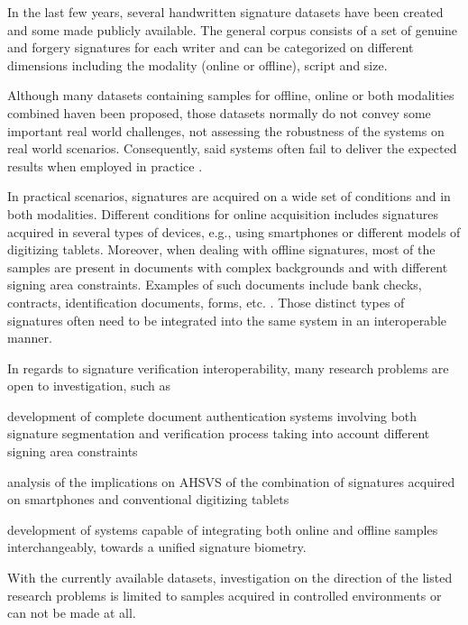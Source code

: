 In the last few years, several handwritten signature datasets have been created and some made publicly available. The general corpus consists of a set of genuine and forgery signatures for each writer and can be categorized on different dimensions including the modality (online or offline), script and size.

Although many datasets containing samples for offline, online or both modalities combined haven been proposed, those datasets normally do not convey some important real world challenges, not assessing the robustness of the systems on real world scenarios. Consequently, said systems often fail to deliver the expected results when employed in practice \cite{towards2013}.

In practical scenarios, signatures are acquired on a wide set of conditions and in both modalities. Different conditions for online acquisition includes signatures acquired in several types of devices, e.g., using smartphones or different models of digitizing tablets. Moreover, when dealing with offline signatures, most of the samples are present in documents with complex backgrounds and with different signing area constraints. Examples of such documents include bank checks, contracts, identification documents, forms, etc. \cite{towards2013, liwicki-sigseg}. Those distinct types of signatures often need to be integrated into the same system in an interoperable manner.


In regards to signature verification interoperability, many research problems are open to investigation, such as
\begin{inlinelist}
  \item development of complete document authentication systems involving both signature segmentation and verification process taking into account different signing area constraints
  \item analysis of the implications on AHSVS of the combination of signatures acquired on smartphones and conventional digitizing tablets
  \item development of systems capable of integrating both online and offline samples interchangeably, towards a unified signature biometry.
\end{inlinelist}
With the currently available datasets, investigation on the direction of the listed research problems is limited to samples acquired in controlled environments or can not be made at all.

